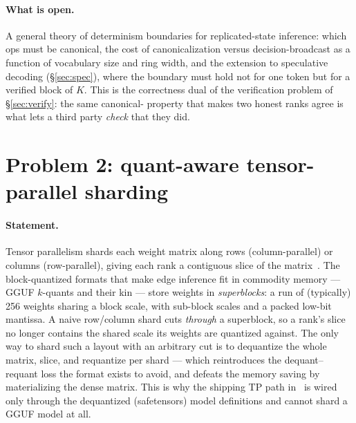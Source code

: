 \documentclass[11pt]{article}
\begin{document}
\paragraph{What is open.} A general theory of determinism boundaries for replicated-state inference: which
ops must be canonical, the cost of canonicalization versus decision-broadcast as a function of vocabulary
size and ring width, and the extension to speculative decoding (\S\ref{sec:spec}), where the boundary must
hold not for one token but for a verified block of $K$. This is the correctness dual of the verification
problem of \S\ref{sec:verify}: the same canonical- property that makes two honest ranks agree is
what lets a third party \emph{check} that they did.

\section{Problem 2: quant-aware tensor-parallel sharding}
\label{sec:quantshard}

\paragraph{Statement.} Tensor parallelism shards each weight matrix along rows (column-parallel) or columns
(row-parallel), giving each rank a contiguous slice of the matrix~\cite{megatron}. The block-quantized
formats that make edge inference fit in commodity memory --- GGUF $k$-quants and their kin --- store
weights in \emph{superblocks}: a run of (typically) 256 weights sharing a block scale, with sub-block
scales and a packed low-bit mantissa. A naive row/column shard cuts \emph{through} a superblock, so a
rank's slice no longer contains the shared scale its weights are quantized against. The only way to shard
such a layout with an arbitrary cut is to dequantize the whole matrix, slice, and requantize per shard ---
which reintroduces the dequant--requant loss the format exists to avoid, and defeats the memory saving by
materializing the dense matrix. This is why the shipping TP path in~\cite{het} is wired only through the
dequantized (safetensors) model definitions and cannot shard a GGUF model at all.
\end{document}

